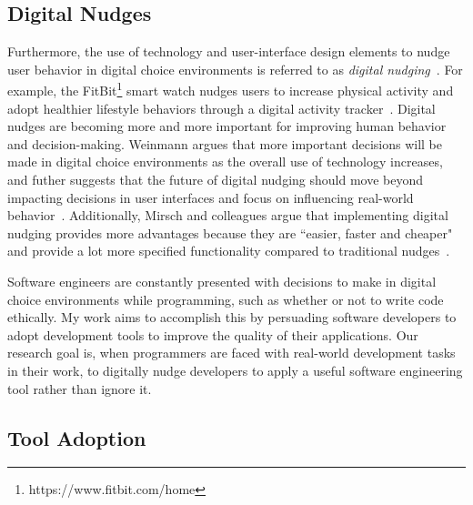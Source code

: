 \subsection{Digital Nudges}

Furthermore, the use of technology and user-interface design elements to nudge user behavior in digital choice environments is referred to as \textit{digital nudging}~\cite{weinmann2016digitalnudging}. For example, the FitBit\footnote{https://www.fitbit.com/home} smart watch nudges users to increase physical activity and adopt healthier lifestyle behaviors through a digital activity tracker~\cite{weinmann2016digitalnudging}. Digital nudges are becoming more and more important for improving human behavior and decision-making. Weinmann argues that more important decisions will be made in digital choice environments as the overall use of technology increases, and futher suggests that the future of digital nudging should move beyond impacting decisions in user interfaces and focus on influencing real-world behavior~\cite{weinmann2016digitalnudging}. Additionally, Mirsch and colleagues argue that implementing digital nudging provides more advantages because they are ``easier, faster and cheaper" and provide a lot more specified functionality compared to traditional nudges~\cite[p.~635]{mirsch2017digital}.

Software engineers are constantly presented with decisions to make in digital choice environments while programming, such as whether or not to write code ethically. My work aims to accomplish this by persuading software developers to adopt development tools to improve the quality of their applications. Our research goal is, when programmers are faced with real-world development tasks in their work, to digitally nudge developers to apply a useful software engineering tool rather than ignore it.


\subsection{Tool Adoption}


